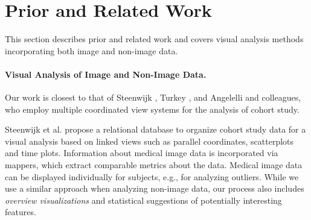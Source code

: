 \documentclass[journal]{style/vgtc} 			          %
\begin{document}
\section{Prior and Related Work}

This section describes prior and related work and covers visual analysis 
methods incorporating both image and non-image data. 

\paragraph{Visual Analysis of Image and Non-Image Data.}

Our work is closest to that of Steenwijk \cite{Steenwijk2010}, Turkey \cite{Turkay2013}, and Angelelli \cite{Angelelli2014} and colleagues, who employ multiple coordinated view systems for the analysis of cohort study.
%

Steenwijk et al. \cite{Steenwijk2010} propose a relational database to organize cohort study data for a visual analysis based on linked views such as parallel coordinates, scatterplots and time plots.
%
Information about medical image data is incorporated via mappers, which extract comparable metrics about the data.
%
Medical image data can be displayed individually for subjects, e.g., for analyzing outliers.
%
While we use a similar approach when analyzing non-image data, our process also includes \emph{overview visualizations} and statistical suggestions of potentially interesting features.
%
\end{document}
